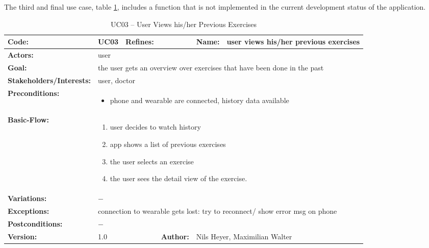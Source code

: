 \clearpage
The third and final use case, table \ref{history}, includes a function that is not implemented in the current development status of the application.
\begin{table}[H]
	\begin{tabular}{|l|l|l|l|l|l|} \hline
		\textbf{Code:} & UC03 & \textbf{Refines:} &  & \textbf{Name:} & user views his/her previous exercises \\ \hline
		\textbf{Actors:} & \multicolumn{5}{l|}{user} \\ \hline
		\textbf{Goal:} & \multicolumn{5}{l|}{the user gets an overview over exercises that have been done in the past} \\ \hline
		\textbf{Stakeholders/Interests:} & \multicolumn{5}{l|}{user, doctor} \\ \hline
		\textbf{Preconditions:} & \multicolumn{5}{l|}{\parbox{0.75\textwidth}{
			\begin{itemize}[itemsep=-5]
				\item phone and wearable are connected, history data available
			\end{itemize}
		}} \\ \hline
		\textbf{Basic-Flow:} & \multicolumn{5}{l|}{\parbox{0.75\textwidth}{
			\begin{enumerate}[itemsep=-5]
				\item user decides to watch history
				\item app shows a list of previous exercises
				\item the user selects an exercise
				\item the user sees the detail view of the exercise.
			\end{enumerate}
		}} \\ \hline
		\textbf{Variations:} & \multicolumn{5}{l|}{\parbox{0.75\textwidth}{
			$-$
		}} \\ \hline
		\textbf{Exceptions:} & \multicolumn{5}{l|}{\parbox{0.75\textwidth}{
			connection to wearable gets lost: try to reconnect/ show error msg on phone
		}} \\ \hline
		\textbf{Postconditions:} & \multicolumn{5}{l|}{$-$} \\ \hline
		\textbf{Version:} & \multicolumn{2}{l|}{1.0} & \textbf{Author:} & \multicolumn{2}{l|}{Nils Heyer, Maximilian Walter} \\ \hline
	\end{tabular}
	\caption{UC03 -- User Views his/her Previous Exercises}
	\label{history}
\end{table}